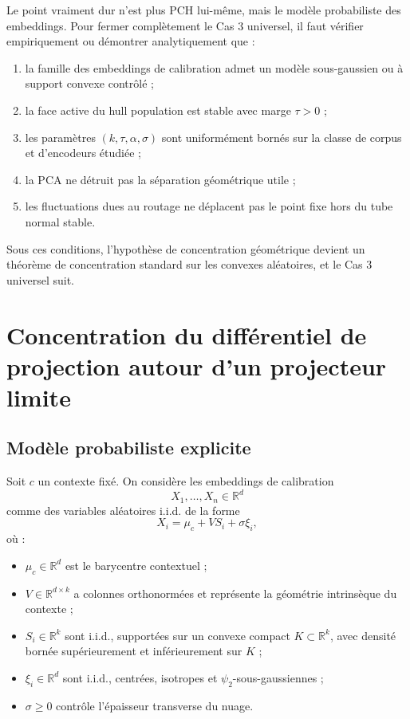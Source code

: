 Le point vraiment dur n'est plus PCH lui-même, mais le modèle probabiliste des embeddings.  
Pour fermer complètement le Cas 3 universel, il faut vérifier empiriquement ou démontrer analytiquement que :

\begin{enumerate}
    \item la famille des embeddings de calibration admet un modèle sous-gaussien ou à support convexe contrôlé ;
    \item la face active du hull population est stable avec marge \(\tau>0\) ;
    \item les paramètres \((k,\tau,\alpha,\sigma)\) sont uniformément bornés sur la classe de corpus et d'encodeurs étudiée ;
    \item la PCA ne détruit pas la séparation géométrique utile ;
    \item les fluctuations dues au routage ne déplacent pas le point fixe hors du tube normal stable.
\end{enumerate}

Sous ces conditions, l'hypothèse de concentration géométrique devient un théorème de concentration standard sur les convexes aléatoires, et le Cas 3 universel suit.






\section{Concentration du différentiel de projection autour d'un projecteur limite}

\subsection{Modèle probabiliste explicite}

Soit \(c\) un contexte fixé. On considère les embeddings de calibration
\[
X_1,\dots,X_n \in \mathbb R^d
\]
comme des variables aléatoires i.i.d. de la forme
\[
X_i=\mu_c+V S_i+\sigma \xi_i,
\]
où :

\begin{itemize}
    \item \(\mu_c\in\mathbb R^d\) est le barycentre contextuel ;
    \item \(V\in\mathbb R^{d\times k}\) a colonnes orthonormées et représente la géométrie intrinsèque du contexte ;
    \item \(S_i\in\mathbb R^k\) sont i.i.d., supportées sur un convexe compact \(K\subset\mathbb R^k\), avec densité bornée supérieurement et inférieurement sur \(K\) ;
    \item \(\xi_i\in\mathbb R^d\) sont i.i.d., centrées, isotropes et \(\psi_2\)-sous-gaussiennes ;
    \item \(\sigma\ge 0\) contrôle l'épaisseur transverse du nuage.
\end{itemize}

